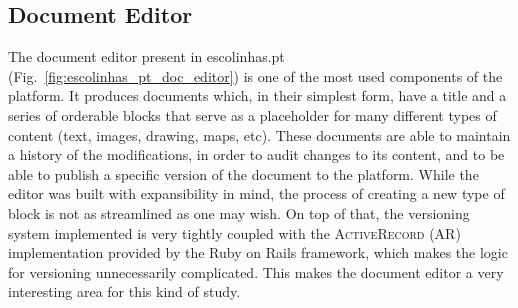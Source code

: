 \subsection{Document Editor}\label{sec:case-study_areas_document_editor}
The document editor present in escolinhas.pt (Fig.~\ref{fig:escolinhas_pt_doc_editor}) is one of the most used components of the platform. It produces documents which, in their simplest form, have a title and a series of orderable blocks that serve as a placeholder for many different types of content (text, images, drawing, maps, etc). These documents are able to maintain a history of the modifications, in order to audit changes to its content, and to be able to publish a specific version of the document to the platform. While the editor was built with expansibility in mind, the process of creating a new type of block is not as streamlined as one may wish. On top of that, the versioning system implemented is very tightly coupled with the \textsc{ActiveRecord} (AR) implementation provided by the Ruby on Rails framework, which makes the logic for versioning unnecessarily complicated. This makes the document editor a very interesting area for this kind of study.

